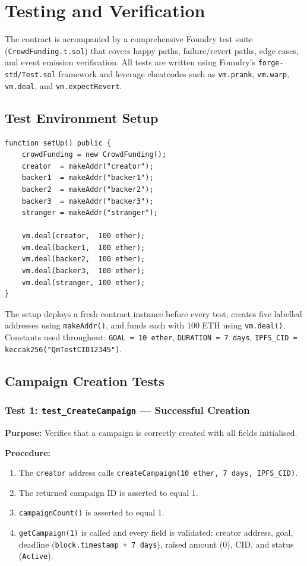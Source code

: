 \section{Testing and Verification}
\label{sec:testing}

The contract is accompanied by a comprehensive Foundry test suite (\texttt{CrowdFunding.t.sol}) that covers happy paths, failure/revert paths, edge cases, and event emission verification. All tests are written using Foundry's \texttt{forge-std/Test.sol} framework and leverage cheatcodes such as \texttt{vm.prank}, \texttt{vm.warp}, \texttt{vm.deal}, and \texttt{vm.expectRevert}.

\subsection{Test Environment Setup}

\begin{lstlisting}[language=Solidity, caption={Test Setup}]
function setUp() public {
    crowdFunding = new CrowdFunding();
    creator  = makeAddr("creator");
    backer1  = makeAddr("backer1");
    backer2  = makeAddr("backer2");
    backer3  = makeAddr("backer3");
    stranger = makeAddr("stranger");

    vm.deal(creator,  100 ether);
    vm.deal(backer1,  100 ether);
    vm.deal(backer2,  100 ether);
    vm.deal(backer3,  100 ether);
    vm.deal(stranger, 100 ether);
}
\end{lstlisting}

The setup deploys a fresh contract instance before every test, creates five labelled addresses using \texttt{makeAddr()}, and funds each with 100 ETH using \texttt{vm.deal()}. Constants used throughout: \texttt{GOAL = 10 ether}, \texttt{DURATION = 7 days}, \texttt{IPFS\_CID = keccak256("QmTestCID12345")}.

\subsection{Campaign Creation Tests}

\subsubsection{Test 1: \texttt{test\_CreateCampaign} --- Successful Creation}

\textbf{Purpose:} Verifies that a campaign is correctly created with all fields initialised.

\textbf{Procedure:}
\begin{enumerate}[leftmargin=1.5em]
    \item The \texttt{creator} address calls \texttt{createCampaign(10 ether, 7 days, IPFS\_CID)}.
    \item The returned campaign ID is asserted to equal 1.
    \item \texttt{campaignCount()} is asserted to equal 1.
    \item \texttt{getCampaign(1)} is called and every field is validated: creator address, goal, deadline (\texttt{block.timestamp + 7 days}), raised amount (0), CID, and status (\texttt{Active}).
\end{enumerate}

